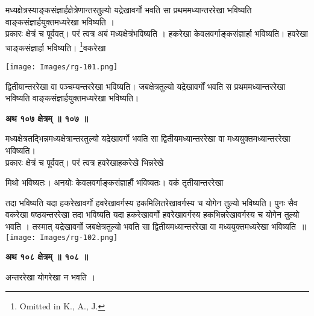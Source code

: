 \documentclass[11pt, openany]{book}
\begin{document}
{\ab मध्यक्षेत्रस्याङ्कसंज्ञार्हक्षेत्रेणान्तरतुल्यो यद्रेखावर्गो भवति सा प्रथममध्यान्तररेखा भविष्यति वाङ्कसंज्ञार्हयुक्तमध्यरेखा भविष्यति ।}\\

प्रकारः क्षेत्रं च पूर्ववत्। परं त्वत्र अबं मध्यक्षेत्रंभविष्यति । हकरेखा  केवलवर्गाङ्कसंज्ञार्हा भविष्यति। 
हवरेखा चाङ्कसंज्ञार्हा भविष्यति। \renewcommand{\thefootnote}{२}\footnote{{\en Omitted in K., A., J.}}वकरेखा 
\begin{center}
\noindent \texttt{[image: Images/rg-101.png]}
\end{center}
द्वितीयान्तररेखा वा पञ्चम्यन्तररेखा भविष्यति। जबक्षेत्रतुल्यो यद्रेखावर्गों भवति
स प्रथममध्यान्तररेखा भविष्यति वाङ्कसंज्ञार्हयुक्तमध्यरेखा भविष्यति। \\


\begin{center}
\textbf{\large अथ १०७ क्षेत्रम् ॥ १०७ ॥}
\end{center}
\vspace{2mm}

{\ab मध्यक्षेत्रतद्भिन्नमध्यक्षेत्रान्तरतुल्यो यद्रेखावर्गो भवति
सा द्वितीयमध्यान्तररेखा वा मध्ययुक्तमध्यान्तररेखा भविष्यति।}\\

 प्रकारः क्षेत्रं च पूर्ववत्। परं त्वत्र हवरेखाहकरेखे भिन्नरेखे

\newpage

\noindent मिथो भविष्यतः। अनयोः केवलवर्गाङ्कसंज्ञार्हौ भविष्यतः। वकं तृतीयान्तररेखा 
\begin{vwcol}[widths={0.6,0.4}, sep=.8cm, rule=0pt]
तदा भविष्यति यदा हकरेखावर्गो हवरेखावर्गस्य हकमिलितरेखावर्गस्य च योगेन
तुल्यो भविष्यति। पुनः सैव वकरेखा षष्ठयन्तररेखा तदा भविष्यति यदा हकरेखावर्गो हवरेखावर्गस्य हकभिन्नरेखावर्गस्य च योगेन तुल्यो भवति । तस्मात् यद्रेखावर्गो जबक्षेत्रतुल्यो भवति सा द्वितीयमध्यान्तररेखा वा मध्ययुक्तमध्यरेखा भविष्यति~॥\\
\noindent \texttt{[image: Images/rg-102.png]}
\end{vwcol}
\vspace{2mm}


\begin{center}
\textbf{\large अथ १०८ क्षेत्रम् ॥ १०८ ॥}
\end{center}
\vspace{5mm}

{\ab अन्तररेखा योगरेखा न भवति ।}\\
\vspace{3mm}
\end{document}
